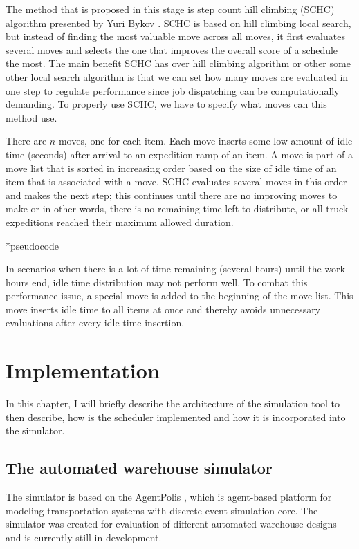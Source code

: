 \documentclass{ctuthesis}
\begin{document}
The method that is proposed in this stage is step count hill climbing (SCHC) algorithm presented by Yuri Bykov \cite{yuri}. SCHC is based on hill climbing local search, but instead of finding the most valuable move across all moves, it first evaluates several moves and selects the one that improves the overall score of a schedule the most. The main benefit SCHC has over hill climbing algorithm or other some other local search algorithm is that we can set how many moves are evaluated in one step to regulate performance since job dispatching can be computationally demanding. To properly use SCHC, we have to specify what moves can this method use. 

There are $n$ moves, one for each item. Each move inserts some low amount of idle time (seconds) after arrival to an expedition ramp of an item. A move is part of a move list that is sorted in increasing order based on the size of idle time of an item that is associated with a move. SCHC evaluates several moves in this order and makes the next step; this continues until there are no improving moves to make or in other words, there is no remaining time left to distribute, or all truck expeditions reached their maximum allowed duration.

*pseudocode

In scenarios when there is a lot of time remaining (several hours) until the work hours end, idle time distribution may not perform well. To combat this performance issue, a special move is added to the beginning of the move list. This move inserts idle time to all items at once and thereby avoids unnecessary evaluations after every idle time insertion.

\chapter{Implementation}

 In this chapter, I will briefly describe the architecture of the simulation tool to then describe, how is the scheduler implemented and how it is incorporated into the simulator.

\section{The automated warehouse simulator}

 The simulator is based on the AgentPolis \cite{agentpolis}, which is agent-based platform for modeling transportation systems with discrete-event simulation core. The simulator was created for evaluation of different automated warehouse designs and is currently still in development.
 
\end{document}
